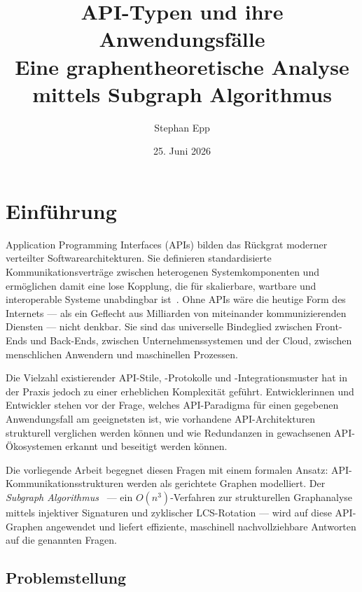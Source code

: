 ﻿\documentclass[a4paper,12pt]{article}
\title{API-Typen und ihre Anwendungsfälle\\[0.4em]
\large Eine graphentheoretische Analyse mittels Subgraph Algorithmus}
\author{Stephan Epp}
\date{25. Juni 2026}
\theoremstyle{definition}
\begin{document}
\maketitle
\tableofcontents
\newpage

\section{Einführung}

Application Programming Interfaces (APIs) bilden das Rückgrat moderner verteilter
Softwarearchitekturen. Sie definieren standardisierte Kommunikationsverträge zwischen
heterogenen Systemkomponenten und ermöglichen damit eine lose Kopplung, die für
skalierbare, wartbare und interoperable Systeme unabdingbar ist~\cite{fielding2000}.
Ohne APIs wäre die heutige Form des Internets --- als ein Geflecht aus Milliarden
von miteinander kommunizierenden Diensten --- nicht denkbar. Sie sind das universelle
Bindeglied zwischen Front-Ends und Back-Ends, zwischen Unternehmenssystemen und der
Cloud, zwischen menschlichen Anwendern und maschinellen Prozessen.

Die Vielzahl existierender API-Stile, -Protokolle und -Integrationsmuster hat in der
Praxis jedoch zu einer erheblichen Komplexität geführt. Entwicklerinnen und Entwickler
stehen vor der Frage, welches API-Paradigma für einen gegebenen Anwendungsfall am
geeignetsten ist, wie vorhandene API-Architekturen strukturell verglichen werden können
und wie Redundanzen in gewachsenen API-Ökosystemen erkannt und beseitigt werden können.

Die vorliegende Arbeit begegnet diesen Fragen mit einem formalen Ansatz: API-Kommunikations\-strukturen
werden als gerichtete Graphen modelliert. Der \emph{Subgraph Algorithmus}~\cite{epp2026}
--- ein $O(n^3)$-Verfahren zur strukturellen Graphanalyse mittels injektiver Signaturen
und zyklischer LCS-Rotation --- wird auf diese API-Graphen angewendet und liefert
effiziente, maschinell nachvollziehbare Antworten auf die genannten Fragen.

\subsection{Problemstellung}
\end{document}
